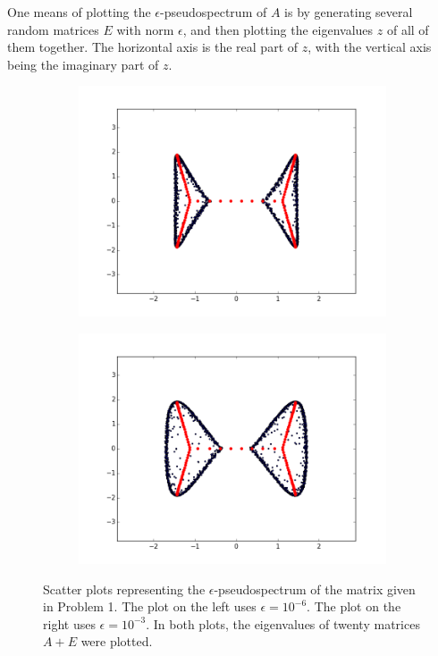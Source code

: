 One means of plotting the $\epsilon$-pseudospectrum of $A$ is by generating several random matrices $E$ with norm $\epsilon$, and then plotting the eigenvalues $z$ of all of them together.  The horizontal axis is the real part of $z$, with the vertical axis being the imaginary part of $z$.

\begin{figure}
\begin{center}
\begin{subfigure}[b]{.49\textwidth}
\centering
\includegraphics[width=\textwidth]{ps_scatter1}
\end{subfigure}
\begin{subfigure}[b]{.49\textwidth}
\centering
\includegraphics[width=\textwidth]{ps_scatter2}
\end{subfigure}
\caption{Scatter plots representing the $\epsilon$-pseudospectrum of the matrix given in Problem 1. The plot on the left uses $\epsilon=10^{-6}$. The plot on the right uses $\epsilon=10^{-3}$. In both plots, the eigenvalues of twenty matrices $A+E$ were plotted.}
\label{fig:ps_scatter}
\end{center}
\end{figure}


